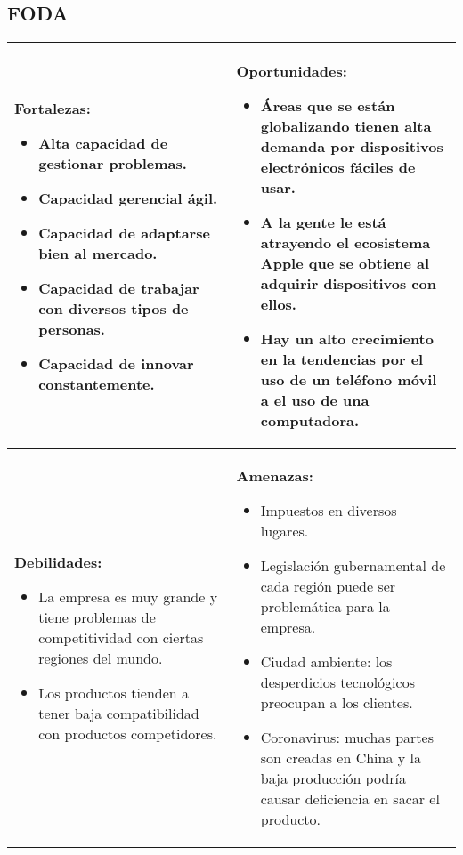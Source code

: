 \documentclass{article}
\begin{document}
\subsection{FODA}
\begin{center}
   \begin{tabular}{ | p{8.25cm} | p{8.25cm} | }
        \hline
            \textbf{Fortalezas: } 
            \begin{itemize}
                \item Alta capacidad de gestionar problemas.
                \item Capacidad gerencial ágil.
                \item Capacidad de adaptarse bien al mercado.
                \item Capacidad de trabajar con diversos tipos de personas.
                \item Capacidad de innovar constantemente.
            \end{itemize}
            &
            \textbf{Oportunidades: } 
            \begin{itemize}
                \item Áreas que se están globalizando tienen alta demanda por dispositivos electrónicos fáciles de usar.
                \item A la gente le está atrayendo el ecosistema Apple que se obtiene al adquirir dispositivos con ellos.
                \item Hay un alto crecimiento en la tendencias por el uso de un teléfono móvil a el uso de una computadora. 
            \end{itemize}
            \\ 
        \hline
            \textbf{Debilidades: } 
            \begin{itemize}
                \item La empresa es muy grande y tiene problemas de competitividad con ciertas regiones del mundo.
                \item Los productos tienden a tener baja compatibilidad con productos competidores.
            \end{itemize}
            &
            \textbf{Amenazas: } 
            \begin{itemize}
                \item Impuestos en diversos lugares.
                \item Legislación gubernamental de cada región puede ser problemática para la empresa.
                \item Ciudad ambiente: los desperdicios tecnológicos preocupan a los clientes. 
                \item Coronavirus: muchas partes son creadas en China y la baja producción podría causar deficiencia en sacar el producto.
            \end{itemize}
            \\ 
        \hline
   \end{tabular}
\end{center}
\end{document}
